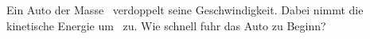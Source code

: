 Ein Auto der Masse \mauO\ verdoppelt seine Geschwindigkeit. Dabei nimmt die kinetische Energie um \dEO\ zu. Wie schnell fuhr das Auto zu Beginn?
